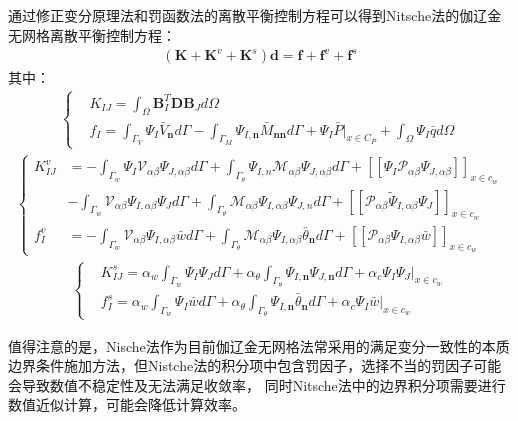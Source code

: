 通过修正变分原理法和罚函数法的离散平衡控制方程可以得到Nitsche法的伽辽金无网格离散平衡控制方程：
\begin{equation}
\begin{split}
    (\pmb{K}+\pmb{K}^v+\pmb{K}^s)\pmb{d}=\pmb{f}+\pmb{f}^v+\pmb{f}^s
\end{split}
\end{equation}
其中：
\begin{equation}
\begin{split}
\begin{cases}
    &K_{I\!J}=\int_{\Omega}\pmb{B}^T_I\pmb{D}\pmb{B}_Jd\Omega\\
    &f_I=\int_{\Gamma_V}\Psi_I\bar{V}_{\pmb{n}}d\Gamma-\int_{\Gamma_M}\Psi_{I,\pmb{n}}\bar{M}_{\pmb{nn}}d\Gamma+\Psi_I\bar{P}\vert_{x\in C_P}+\int_{\Omega}\Psi_I\bar{q}d\Omega
\end{cases}
\end{split}
\end{equation}
\begin{equation}
\begin{split}
\begin{cases}
     K^v_{I\!J}&=-\int_{\Gamma_w}\Psi_I\mathcal{V}_{\alpha\beta}\Psi_{J,\alpha\beta}d\Gamma+\int_{\Gamma_{\theta}}\Psi_{I,n}\mathcal{M}_{\alpha\beta}\Psi_{J,\alpha\beta}d\Gamma+[[\Psi_I\mathcal{P}_{\alpha\beta}\Psi_{J,\alpha\beta}]]_{x\in{c_w}}\\
     &-\int_{\Gamma_w}\mathcal{V}_{\alpha\beta}\Psi_{I,\alpha\beta}\Psi_Jd\Gamma+\int_{\Gamma_{\theta}}\mathcal{M}_{\alpha\beta}\Psi_{I,\alpha\beta}\Psi_{J,n}d\Gamma+[[\mathcal{P}_{\alpha\beta}\tilde{\Psi}_{I,\alpha\beta}\Psi_J]]_{x\in{c_w}}\\
     f_{I}^v&=-\int_{\Gamma_w}\mathcal{V}_{\alpha\beta}\Psi_{I,\alpha\beta}\bar{w}d\Gamma+\int_{\Gamma_{\theta}}\mathcal{M}_{\alpha\beta}\Psi_{I,\alpha\beta}\bar{\theta}_{\pmb n}d\Gamma+[[\mathcal{P}_{\alpha\beta}\Psi_{I,\alpha\beta}\bar{w}]]_{x\in{c_w}}
\end{cases}
\end{split}
\end{equation}
\begin{equation}
\begin{split}
\begin{cases}
   &K^s_{I\!J}=\alpha_w\int_{\Gamma_w}\Psi_I\Psi_Jd\Gamma+\alpha_{\theta}\int_{\Gamma_{\theta}}\Psi_{I,\pmb n}\Psi_{J,\pmb n}d\Gamma+\alpha_c\Psi_I\Psi_J\vert_{x\in c_w}\\
&f^s_I=\alpha_w\int_{\Gamma_w}\Psi_I\bar{w}d\Gamma+\alpha_{\theta}\int_{\Gamma_{\theta}}\Psi_{I,\pmb n}\bar{\theta}_{\pmb n}d\Gamma+\alpha_c\Psi_I\bar{w}\vert_{x\in c_w}
\end{cases}
\end{split}
\end{equation}\par
值得注意的是，Nische法作为目前伽辽金无网格法常采用的满足变分一致性的本质边界条件施加方法，但Nistche法的积分项中包含罚因子，选择不当的罚因子可能会导致数值不稳定性及无法满足收敛率，
同时Nitsche法中的边界积分项需要进行数值近似计算，可能会降低计算效率。
